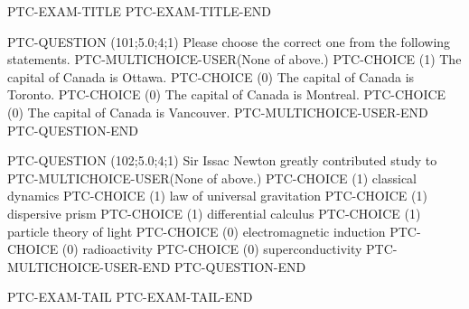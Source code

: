 \documentclass[12pt]{article}
\begin{document}
PTC-EXAM-TITLE
PTC-EXAM-TITLE-END


PTC-QUESTION  (101;5.0;4;1)
Please choose the correct one from the following statements.
PTC-MULTICHOICE-USER(None of above.)
   PTC-CHOICE (1) The capital of Canada is Ottawa.
   PTC-CHOICE (0) The capital of Canada is Toronto.
   PTC-CHOICE (0) The capital of Canada is Montreal. 
   PTC-CHOICE (0) The capital of Canada is Vancouver.
PTC-MULTICHOICE-USER-END
PTC-QUESTION-END


PTC-QUESTION  (102;5.0;4;1)
Sir Issac Newton greatly contributed study to
PTC-MULTICHOICE-USER(None of above.)
   PTC-CHOICE (1) classical dynamics
   PTC-CHOICE (1) law of universal gravitation
   PTC-CHOICE (1) dispersive prism 
   PTC-CHOICE (1) differential calculus
   PTC-CHOICE (1) particle theory of light
   PTC-CHOICE (0) electromagnetic induction
   PTC-CHOICE (0) radioactivity
   PTC-CHOICE (0) superconductivity
PTC-MULTICHOICE-USER-END
PTC-QUESTION-END



PTC-EXAM-TAIL
PTC-EXAM-TAIL-END
\end{document}
